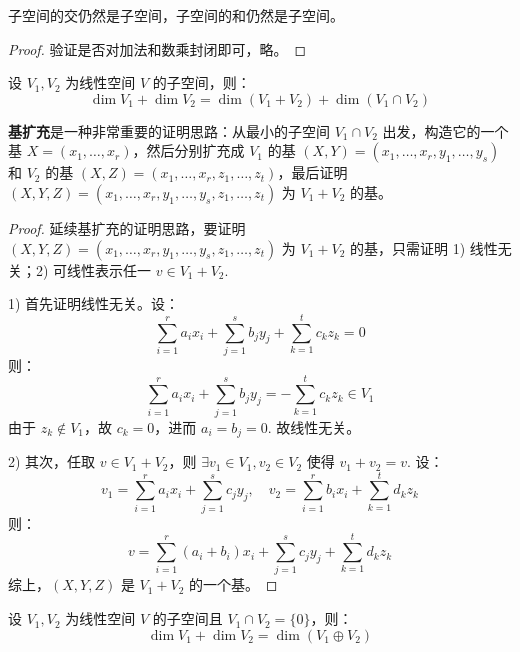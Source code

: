 
\begin{theorem}
子空间的交仍然是子空间，子空间的和仍然是子空间。
\end{theorem}
\begin{proof}
验证是否对加法和数乘封闭即可，略。
\end{proof}

\begin{theorem}[子空间和的维数公式]
设 $V_1,V_2$ 为线性空间 $V$ 的子空间，则：
\[
    \dim V_1+\dim V_2=\dim (V_1+V_2)+\dim (V_1\cap V_2)
\]    
\end{theorem}

\begin{remark}
\textbf{基扩充}是一种非常重要的证明思路：从最小的子空间 $V_1\cap V_2$ 出发，构造它的一个基 $X=(x_1,\ldots,x_r)$，然后分别扩充成 $V_1$ 的基 $(X,Y)=(x_1,\ldots,x_r,y_1,\ldots,y_s)$ 和 $V_2$ 的基 $(X,Z)=(x_1,\ldots,x_r,z_1,\ldots,z_t)$，最后证明 $(X,Y,Z)=(x_1,\ldots,x_r,y_1,\ldots,y_s,z_1,\ldots,z_t)$ 为 $V_1+V_2$ 的基。    
\end{remark}

\begin{proof}
延续基扩充的证明思路，要证明 $(X,Y,Z)=(x_1,\ldots,x_r,y_1,\ldots,y_s,z_1,\ldots,z_t)$ 为 $V_1+V_2$ 的基，只需证明 1) 线性无关；2) 可线性表示任一 $v\in V_1+V_2$.

1) 首先证明线性无关。设：
\[
    \sum_{i=1}^r a_ix_i+\sum_{j=1}^s b_jy_j+\sum_{k=1}^t c_kz_k=0
\]
则：
\[
    \sum_{i=1}^r a_ix_i+\sum_{j=1}^s b_jy_j=-\sum_{k=1}^t c_kz_k\in V_1
\]
由于 $z_k\notin V_1$，故 $c_k=0$，进而 $a_i=b_j=0$. 故线性无关。

2) 其次，任取 $v\in V_1+V_2$，则 $\exists v_1\in V_1,v_2\in V_2$ 使得 $v_1+v_2=v$. 设：
\[
    v_1=\sum_{i=1}^r a_ix_i+\sum_{j=1}^s c_jy_j,\quad v_2=\sum_{i=1}^r b_ix_i+\sum_{k=1}^t d_kz_k
\]
则：
\[
    v=\sum_{i=1}^r(a_i+b_i)x_i+\sum_{j=1}^s c_jy_j+\sum_{k=1}^t d_kz_k
\]
综上，$(X,Y,Z)$ 是 $V_1+V_2$ 的一个基。    
\end{proof}

\begin{corollary}
设 $V_1,V_2$ 为线性空间 $V$ 的子空间且 $V_1\cap V_2=\{0\}$，则：
\[
    \dim V_1+\dim V_2=\dim (V_1\oplus V_2)
\]
\end{corollary}

